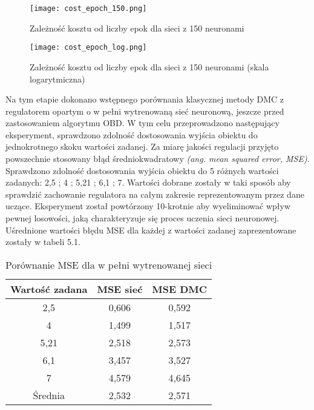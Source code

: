\begin{figure}[!htb]
  \label{fig:Koszt-liczba-epok}
  \centering \texttt{[image: cost\_epoch\_150.png]}
  \caption{Zależność kosztu od liczby epok dla sieci z 150 neuronami}
\end{figure}

\begin{figure}[!htb]
  \label{fig:Koszt-liczba-epok-zoom}
  \centering \texttt{[image: cost\_epoch\_log.png]}
  \caption{Zależność kosztu od liczby epok dla sieci z 150 neuronami (skala logarytmiczna)}
\end{figure}

\par Na tym etapie dokonano wstępnego porównania klasycznej metody DMC z regulatorem opartym o w pełni wytrenowaną sieć neuronową, jeszcze przed zastosowaniem algorytmu OBD. W tym celu przeprowadzono następujący eksperyment, sprawdzono zdolność dostosowania wyjścia obiektu do jednokrotnego skoku wartości zadanej. Za miarę jakości regulacji przyjęto powszechnie stosowany błąd średniokwadratowy \emph{(ang. mean squared error, MSE)}. Sprawdzono zdolność dostosowania wyjścia obiektu do 5 różnych wartości zadanych: 2,5 ; 4 ; 5,21 ; 6,1 ; 7. Wartości dobrane zostały w taki sposób aby sprawdzić zachowanie regulatora na całym zakresie reprezentowanym przez dane uczące. Eksperyment został powtórzony 10-krotnie aby wyeliminować wpływ pewnej losowości, jaką charakteryzuje się proces uczenia sieci neuronowej. Uśrednione wartości błędu MSE dla każdej z wartości zadanej zaprezentowane zostały w tabeli 5.1.
\begin{table}[!h] \label{tab:tabela1} \centering
\caption{Porównanie MSE dla w pełni wytrenowanej sieci}
\begin{tabular} {| c | c | c |} \hline
    Wartość zadana & MSE sieć & MSE DMC \\ \hline\hline
    2,5 & 0,606 & 0,592 \\ \hline
    4 & 1,499 & 1,517 \\ \hline
    5,21 & 2,518 & 2,573 \\ \hline
    6,1 & 3,457 & 3,527 \\ \hline
    7 & 4,579 & 4,645 \\ \hline
    Średnia & 2,532 & 2,571 \\ \hline
    
\end{tabular}
\end{table}
